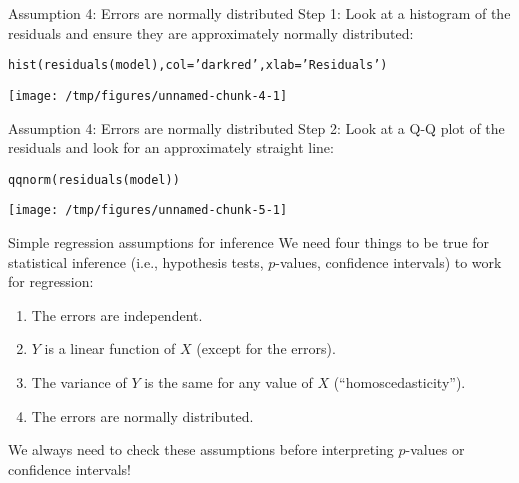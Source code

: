 \documentclass{beamer}\usepackage[]{graphicx}\usepackage[]{color}
\makeatletter
\def\maxwidth{ %
  \ifdim\Gin@nat@width>\linewidth
    \linewidth
  \else
    \Gin@nat@width
  \fi
}
\newcommand{\hlstr}[1]{\textcolor[rgb]{1,0.894,0.71}{#1}}%
\newcommand{\hlstd}[1]{\textcolor[rgb]{1,0.894,0.769}{#1}}%
\newcommand{\hlkwc}[1]{\textcolor[rgb]{0.78,0.941,0.545}{#1}}%
\newcommand{\hlkwd}[1]{\textcolor[rgb]{1,0.78,0.769}{#1}}%
\newenvironment{kframe}{%
 \def\at@end@of@kframe{}%
 \ifinner\ifhmode%
  \def\at@end@of@kframe{\end{minipage}}%
  \begin{minipage}{\columnwidth}%
 \fi\fi%
 \def\FrameCommand##1{\hskip\@totalleftmargin \hskip-\fboxsep
 \colorbox{shadecolor}{##1}\hskip-\fboxsep
     \hskip-\linewidth \hskip-\@totalleftmargin \hskip\columnwidth}%
 \MakeFramed {\advance\hsize-\width
   \@totalleftmargin\z@ \linewidth\hsize
   \@setminipage}}%
 {\par\unskip\endMakeFramed%
 \at@end@of@kframe}
\newenvironment{knitrout}{}{} %
\makeatother
\begin{document}
\begin{darkframes}
    \begin{frame}[fragile]{Assumption 4: Errors are normally distributed}
      Step 1: Look at a histogram of the residuals and ensure they are approximately normally distributed:
\begin{knitrout}
\color{fgcolor}\begin{kframe}
\begin{alltt}
\hlkwd{hist}\hlstd{(}\hlkwd{residuals}\hlstd{(model),} \hlkwc{col}\hlstd{=}\hlstr{'darkred'}\hlstd{,} \hlkwc{xlab}\hlstd{=}\hlstr{'Residuals'}\hlstd{)}
\end{alltt}
\end{kframe}
\texttt{[image: /tmp/figures/unnamed-chunk-4-1]} 

\end{knitrout}
    \end{frame}

    \begin{frame}[fragile]{Assumption 4: Errors are normally distributed}
      Step 2: Look at a Q-Q plot of the residuals and look for an approximately straight line:
\begin{knitrout}
\color{fgcolor}\begin{kframe}
\begin{alltt}
\hlkwd{qqnorm}\hlstd{(}\hlkwd{residuals}\hlstd{(model))}
\end{alltt}
\end{kframe}
\texttt{[image: /tmp/figures/unnamed-chunk-5-1]} 

\end{knitrout}
    \end{frame}

    \begin{frame}{Simple regression assumptions for inference}
      We need four things to be true for statistical inference (i.e., hypothesis tests, $p$-values, confidence intervals) to work for regression:
      \begin{enumerate}
        \item The errors are independent. \greencheckmark
        \item $Y$ is a linear function of $X$ (except for the errors). \greencheckmark
        \item The variance of $Y$ is the same for any value of $X$ (``homoscedasticity''). \greencheckmark
        \item The errors are normally distributed. \greencheckmark
      \end{enumerate}
      \pause
      \alert{We always need to check these assumptions before interpreting $p$-values or confidence intervals!}
    \end{frame}
  \end{darkframes}
\end{document}

